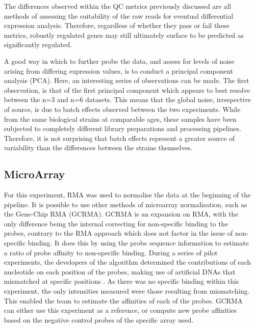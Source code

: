 The differences observed within the QC metrics previously discussed are all methods of assessing the suitability of the raw reads for eventual differential expression analysis. Therefore, regardless of whether they pass or fail these metrics, robustly regulated genes may still ultimately surface to be predicted as significantly regulated.

A good way in which to further probe the data, and assess for levels of noise arising from differing expression values, is to conduct a principal component analysis (PCA). Here, an interesting series of observations can be made. The first observation, is that of the first principal component which appears to best resolve between the n=3 and n=6 datasets. This means that the global noise, irrespective of source, is due to batch effects observed between the two experiments. While from the same biological strains at comparable ages, these samples have been subjected to completely different library preparations and processing pipelines. Therefore, it is not surprising that batch effects represent a greater source of variability than the differences between the strains themselves. 

\subsection{MicroArray}

For this experiment, RMA was used to normalise the data at the beginning of the pipeline. It is possible to use other methods of microarray normalisation, such as the Gene-Chip RMA (GCRMA). GCRMA is an expansion on RMA, with the only difference being the internal correcting for non-specific binding to the probes, contrary to the RMA approach which does not factor in the issue of non-specific binding. It does this by using the probe sequence information to estimate a ratio of probe affinity to non-specific binding. During a series of pilot experiments, the developers of the algorithm determined the contributions of each nucleotide on each position of the probes, making use of artificial DNAs that mismatched at specific positions \cite{doi:10.1198/016214504000000683}. As there was no specific binding within this experiment, the only intensities measured were those resulting from mismatching. This enabled the team to estimate the affinities of each of the probes. GCRMA can either use this experiment as a reference, or compute new probe affinities based on the negative control probes of the specific array used.


